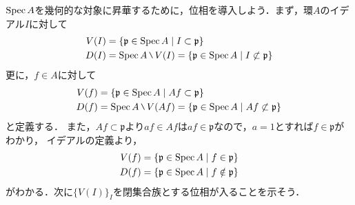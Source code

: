 
$\mathrm{Spec}\, A$を幾何的な対象に昇華するために，位相を導入しよう．まず，環$A$のイデアル$I$に対して
\begin{align*}
  V(I) &= \{\mathfrak{p} \in \spec{A}\mid I\subset \mathfrak{p}\}\\
  D(I) &= \spec{A}\mysetminus V(I) = \{\mathfrak{p} \in \spec{A}\mid I\not\subset \mathfrak{p}\}
\end{align*}
更に，$f\in A$に対して
\begin{align*}
  V(f) &= \{\mathfrak{p} \in \spec{A}\mid Af \subset \mathfrak{p}\}\\
  D(f) &= \spec{A}\mysetminus V(Af) = \{\mathfrak{p} \in \spec{A}\mid Af \not\subset \mathfrak{p}\}
\end{align*}
と定義する．
また，$Af\subset \mathfrak{p}$より$af\in Af$は$af\in \mathfrak{p}$なので，$a=1$とすれば$f\in \mathfrak{p}$がわかり，
イデアルの定義より，
\begin{align*}
  V(f) &= \{\mathfrak{p} \in \mathrm{Spec}\, A \mid f \in \mathfrak{p}\}\\
  D(f) &= \{\mathfrak{p} \in \mathrm{Spec}\, A \mid f \notin \mathfrak{p}\}
\end{align*}
がわかる．次に$\{V(I)\}_{I}$を閉集合族とする位相が入ることを示そう．

